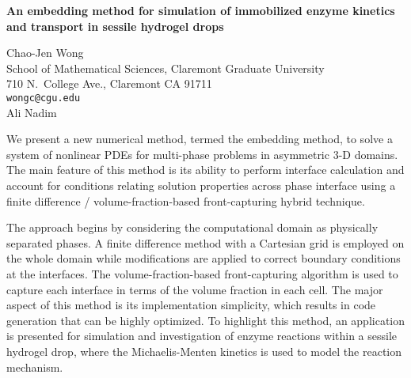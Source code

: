 \documentclass{report}
\begin{document}

\begin{center}
{\large
{\bf An embedding method for simulation of immobilized enzyme kinetics \\
	and transport in sessile hydrogel drops}}

	Chao-Jen Wong \\
	School of Mathematical Sciences, Claremont Graduate University \\
	710 N.~College Ave., Claremont CA 91711 \\
	{\tt wongc@cgu.edu} \\
	Ali Nadim
\end{center}
We
present a new numerical method, termed the embedding method,
to solve a system of nonlinear PDEs for multi-phase problems
in asymmetric 3-D domains. The main feature of this method
is its ability to perform interface calculation and account
for conditions relating solution properties across phase
interface using a finite difference / volume-fraction-based
front-capturing hybrid technique.

The approach begins by
considering the computational domain as physically separated
phases. A finite difference method with a Cartesian grid is
employed on the whole domain while modifications are applied
to correct boundary conditions at the interfaces. The
volume-fraction-based front-capturing algorithm is used to
capture each interface in terms of the volume fraction in
each cell. The major aspect of this method is its
implementation simplicity, which results in code generation
that can be highly optimized. To highlight this method, an
application is presented for simulation and investigation of
enzyme reactions within a sessile hydrogel drop, where the
Michaelis-Menten kinetics is used to model the reaction
mechanism.



\end{document}
